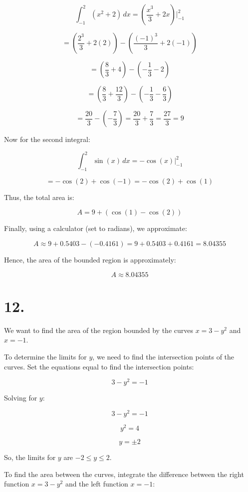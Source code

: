 \documentclass{article}
\begin{document}
\[
\int_{-1}^{2} \left( x^2 + 2 \right) \, dx = \left( \frac{x^3}{3} + 2x \right) \Bigg|_{-1}^{2}
\]

\[
= \left( \frac{2^3}{3} + 2(2) \right) - \left( \frac{(-1)^3}{3} + 2(-1) \right)
\]

\[
= \left( \frac{8}{3} + 4 \right) - \left( -\frac{1}{3} - 2 \right)
\]

\[
= \left( \frac{8}{3} + \frac{12}{3} \right) - \left( -\frac{1}{3} - \frac{6}{3} \right)
\]

\[
= \frac{20}{3} - \left( -\frac{7}{3} \right) = \frac{20}{3} + \frac{7}{3} = \frac{27}{3} = 9
\]

Now for the second integral:

\[
\int_{-1}^{2} \sin(x) \, dx = -\cos(x) \Bigg|_{-1}^{2}
\]

\[
= -\cos(2) + \cos(-1) = -\cos(2) + \cos(1)
\]

Thus, the total area is:

\[
A = 9 + \left( \cos(1) - \cos(2) \right)
\]

Finally, using a calculator (set to radians), we approximate:

\[
A \approx 9 + 0.5403 - (-0.4161) = 9 + 0.5403 + 0.4161 = 8.04355
\]

Hence, the area of the bounded region is approximately:

\[
A \approx 8.04355
\]


\section*{12.}

We want to find the area of the region bounded by the curves \( x = 3 - y^2 \) and \( x = -1 \).



To determine the limits for \( y \), we need to find the intersection points of the curves. Set the equations equal to find the intersection points:

\[
3 - y^2 = -1
\]

Solving for \( y \):

\[
3 - y^2 = -1
\]

\[
y^2 = 4
\]

\[
y = \pm 2
\]

So, the limits for \( y \) are \( -2 \leq y \leq 2 \).


To find the area between the curves, integrate the difference between the right function \( x = 3 - y^2 \) and the left function \( x = -1 \):
\end{document}
